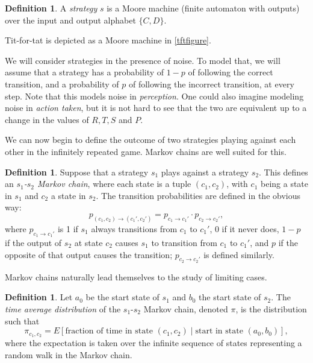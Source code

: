 \documentclass[12pt]{article}
\theoremstyle{definition}
\newtheorem{definition}[theorem]{Definition}
\theoremstyle{remark}
\begin{document}
\begin{definition}
  A \textit{strategy} $s$ is a Moore machine (finite automaton with outputs) over the input and output alphabet $\{C, D\}$. 
\end{definition}

Tit-for-tat is depicted as a Moore machine in \cref{tftfigure}.

We will consider strategies in the presence of noise. To model that, we will assume that a strategy has a probability of $1-p$ of following the correct transition, and a probability of $p$ of following the incorrect transition, at every step. Note that this models noise in \textit{perception}. One could also imagine modeling noise in \textit{action taken}, but it is not hard to see that the two are equivalent up to a change in the values of $R, T, S$ and $P$.

We can now begin to define the outcome of two strategies playing against each other in the infinitely repeated game. Markov chains are well suited for this.

\begin{definition}
  Suppose that a strategy $s_1$ plays against a strategy $s_2$. This defines an \textit{$s_1$-$s_2$ Markov chain}, where each state is a tuple $(c_1,c_2)$, with $c_1$ being a state in $s_1$ and $c_2$ a state in $s_2$. The transition probabilities are defined in the obvious way: \begin{equation*}
    p_{(c_1,c_2) \to (c_1', c_2')} = p_{c_1 \to c_1'} \cdot p_{c_2 \to c_2'},
  \end{equation*} where $p_{c_1 \to c_1'}$ is 1 if $s_1$ always transitions from $c_1$ to $c_1'$, 0 if it never does, $1-p$ if the output of $s_2$ at state $c_2$ causes $s_1$ to transition from $c_1$ to $c_1'$, and $p$ if the opposite of that output causes the transition; $p_{c_2 \to c_2'}$ is defined similarly.
\end{definition}

Markov chains naturally lead themselves to the study of limiting cases.

\begin{definition}
  \label{timeaveragedistribution}
  Let $a_0$ be the start state of $s_1$ and $b_0$ the start state of $s_2$. The \textit{time average distribution} of the $s_1$-$s_2$ Markov chain, denoted $\pi$, is the distribution such that \begin{equation*}
    \pi_{c_1, c_2} = E \left[ \text{fraction of time in state $(c_1,c_2)$} \mid \text{start in state } (a_0, b_0)  \right],
  \end{equation*}
  where the expectation is taken over the infinite sequence of states representing a random walk in the Markov chain.
\end{definition}
\end{document}
